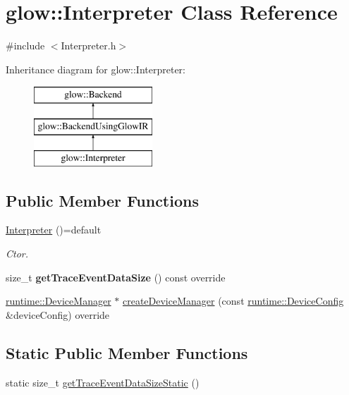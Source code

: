 \hypertarget{classglow_1_1_interpreter}{}\section{glow\+:\+:Interpreter Class Reference}
\label{classglow_1_1_interpreter}


{\ttfamily \#include $<$Interpreter.\+h$>$}

Inheritance diagram for glow\+:\+:Interpreter\+:\begin{figure}[H]
\begin{center}
\leavevmode
\includegraphics[height=3.000000cm]{classglow_1_1_interpreter}
\end{center}
\end{figure}
\subsection*{Public Member Functions}
\begin{DoxyCompactItemize}
\item 
\mbox{\label{classglow_1_1_interpreter_a3f07abd1439980178feb6558cfc1a2dd}} 
\hyperlink{classglow_1_1_interpreter_a3f07abd1439980178feb6558cfc1a2dd}{Interpreter} ()=default
\begin{DoxyCompactList}\small\item\em Ctor. \end{DoxyCompactList}\item 
\mbox{\label{classglow_1_1_interpreter_a1e3131fdf6c79558e269a0241f8ba202}} 
size\+\_\+t {\bfseries get\+Trace\+Event\+Data\+Size} () const override
\item 
\hyperlink{classglow_1_1runtime_1_1_device_manager}{runtime\+::\+Device\+Manager} $\ast$ \hyperlink{classglow_1_1_interpreter_ab14be2abaedd8d7e090bf1aaf874c423}{create\+Device\+Manager} (const \hyperlink{structglow_1_1runtime_1_1_device_config}{runtime\+::\+Device\+Config} \&device\+Config) override
\end{DoxyCompactItemize}
\subsection*{Static Public Member Functions}
\begin{DoxyCompactItemize}
\item 
static size\+\_\+t \hyperlink{classglow_1_1_interpreter_ab113f61cd88594a27b3a86b45c43a3b1}{get\+Trace\+Event\+Data\+Size\+Static} ()
\end{DoxyCompactItemize}
